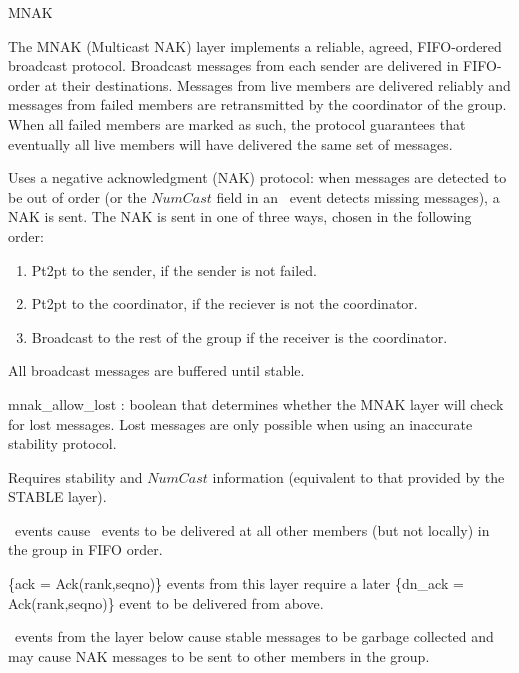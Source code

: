 \begin{Layer}{MNAK}

The MNAK (Multicast NAK) layer implements a reliable, agreed, FIFO-ordered
broadcast protocol.  Broadcast messages from each sender are delivered in
FIFO-order at their destinations.  Messages from live members are delivered
reliably and messages from failed members are retransmitted by the coordinator
of the group.  When all failed members are marked as such, the protocol
guarantees that eventually all live members will have delivered the same set of
messages.

\begin{Protocol}
Uses a negative acknowledgment (NAK) protocol: when messages are detected
to be out of order (or the $NumCast$ field in an \UpStable\ event detects
missing messages), a NAK is sent.  The NAK is sent in one of three ways,
chosen in the following order:
\begin{enumerate}
\item Pt2pt to the sender, if the sender is not failed.
\item Pt2pt to the coordinator, if the reciever is not the coordinator.
\item Broadcast to the rest of the group if the receiver is the
  coordinator.
\end{enumerate}
All broadcast messages are buffered until stable.
\end{Protocol}

\begin{Parameters}
\item mnak\_allow\_lost : boolean that determines whether the MNAK layer will
check for lost messages.  Lost messages are only possible when using an
inaccurate stability protocol.
\end{Parameters}

\begin{Properties}
\item
Requires stability and $NumCast$ information (equivalent to that provided
by the STABLE layer).
\item
\DnCast\ events cause \UpCast\ events to be delivered at all other members
(but not locally) in the group in FIFO order.
\item
\UpCast\{ack = Ack(rank,seqno)\} events from this layer require a later
\DnAck\{dn\_ack = Ack(rank,seqno)\} event to be delivered from above.
\item
\UpStable\ events from the layer below cause stable messages to be garbage
collected and may cause NAK messages to be sent to other members in the
group.
\end{Properties}


\end{Layer}

